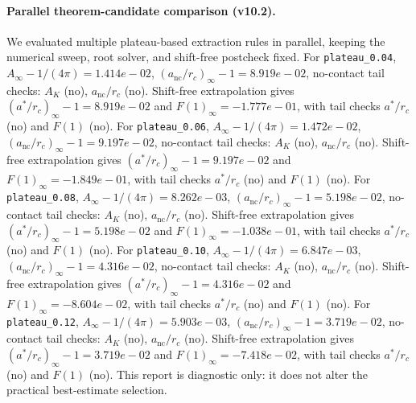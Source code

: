 \paragraph{Parallel theorem-candidate comparison (v10.2).}
We evaluated multiple plateau-based extraction rules in parallel, keeping the numerical sweep, root solver, and shift-free postcheck fixed. For \texttt{plateau_0.04}, $A_\infty-1/(4\pi)=1.414e-02$, $(a_{\mathrm{nc}}/r_c)_\infty-1=8.919e-02$, no-contact tail checks: $A_K$ (no), $a_{\mathrm{nc}}/r_c$ (no). Shift-free extrapolation gives $(a^*/r_c)_\infty-1=8.919e-02$ and $F(1)_\infty=-1.777e-01$, with tail checks $a^*/r_c$ (no) and $F(1)$ (no). For \texttt{plateau_0.06}, $A_\infty-1/(4\pi)=1.472e-02$, $(a_{\mathrm{nc}}/r_c)_\infty-1=9.197e-02$, no-contact tail checks: $A_K$ (no), $a_{\mathrm{nc}}/r_c$ (no). Shift-free extrapolation gives $(a^*/r_c)_\infty-1=9.197e-02$ and $F(1)_\infty=-1.849e-01$, with tail checks $a^*/r_c$ (no) and $F(1)$ (no). For \texttt{plateau_0.08}, $A_\infty-1/(4\pi)=8.262e-03$, $(a_{\mathrm{nc}}/r_c)_\infty-1=5.198e-02$, no-contact tail checks: $A_K$ (no), $a_{\mathrm{nc}}/r_c$ (no). Shift-free extrapolation gives $(a^*/r_c)_\infty-1=5.198e-02$ and $F(1)_\infty=-1.038e-01$, with tail checks $a^*/r_c$ (no) and $F(1)$ (no). For \texttt{plateau_0.10}, $A_\infty-1/(4\pi)=6.847e-03$, $(a_{\mathrm{nc}}/r_c)_\infty-1=4.316e-02$, no-contact tail checks: $A_K$ (no), $a_{\mathrm{nc}}/r_c$ (no). Shift-free extrapolation gives $(a^*/r_c)_\infty-1=4.316e-02$ and $F(1)_\infty=-8.604e-02$, with tail checks $a^*/r_c$ (no) and $F(1)$ (no). For \texttt{plateau_0.12}, $A_\infty-1/(4\pi)=5.903e-03$, $(a_{\mathrm{nc}}/r_c)_\infty-1=3.719e-02$, no-contact tail checks: $A_K$ (no), $a_{\mathrm{nc}}/r_c$ (no). Shift-free extrapolation gives $(a^*/r_c)_\infty-1=3.719e-02$ and $F(1)_\infty=-7.418e-02$, with tail checks $a^*/r_c$ (no) and $F(1)$ (no). This report is diagnostic only: it does not alter the practical best-estimate selection.
